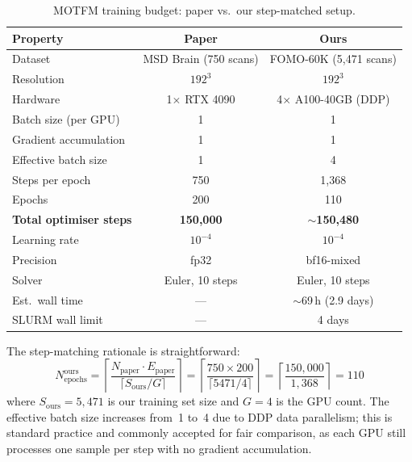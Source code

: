 \begin{table}[ht]
\centering
\caption{MOTFM training budget: paper vs.\ our step-matched setup.}
\label{tab:motfm_budget}
\begin{tabular}{lcc}
\toprule
\textbf{Property} & \textbf{Paper} & \textbf{Ours} \\
\midrule
Dataset                  & MSD Brain (750 scans) & FOMO-60K (5{,}471 scans) \\
Resolution               & $192^3$               & $192^3$ \\
Hardware                 & 1$\times$ RTX 4090    & 4$\times$ A100-40GB (DDP) \\
Batch size (per GPU)     & 1                     & 1 \\
Gradient accumulation    & 1                     & 1 \\
Effective batch size     & 1                     & 4 \\
Steps per epoch          & 750                   & 1{,}368 \\
Epochs                   & 200                   & 110 \\
\textbf{Total optimiser steps} & \textbf{150{,}000} & \textbf{${\sim}$150{,}480} \\
Learning rate            & $10^{-4}$             & $10^{-4}$ \\
Precision                & fp32                  & bf16-mixed \\
Solver                   & Euler, 10 steps       & Euler, 10 steps \\
\midrule
Est.\ wall time          & ---                   & ${\sim}$69\,h (2.9 days) \\
SLURM wall limit         & ---                   & 4 days \\
\bottomrule
\end{tabular}
\end{table}

The step-matching rationale is straightforward:
\begin{equation}
  N_\text{epochs}^\text{ours}
  = \left\lceil \frac{N_\text{paper} \cdot E_\text{paper}}
                     {\lceil S_\text{ours} / G \rceil} \right\rceil
  = \left\lceil \frac{750 \times 200}{\lceil 5471 / 4 \rceil} \right\rceil
  = \left\lceil \frac{150{,}000}{1{,}368} \right\rceil
  = 110
\end{equation}
where $S_\text{ours} = 5{,}471$ is our training set size and $G = 4$ is the GPU
count.  The effective batch size increases from~1 to~4 due to DDP data
parallelism; this is standard practice and commonly accepted for fair
comparison, as each GPU still processes one sample per step with no gradient
accumulation.

